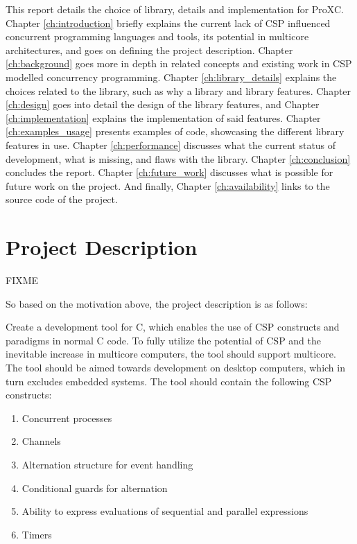 This report details the choice of library, details and implementation for ProXC. Chapter \ref{ch:introduction} briefly explains the current lack of CSP influenced concurrent programming languages and tools, its potential in multicore architectures, and goes on defining the project description. Chapter \ref{ch:background} goes more in depth in related concepts and existing work in CSP modelled concurrency programming. Chapter \ref{ch:library_details} explains the choices related to the library, such as why a library and library features. Chapter \ref{ch:design} goes into detail the design of the library features, and Chapter \ref{ch:implementation} explains the implementation of said features. Chapter \ref{ch:examples_usage} presents examples of code, showcasing the different library features in use. Chapter \ref{ch:performance} discusses what the current status of development, what is missing, and flaws with the library. Chapter \ref{ch:conclusion} concludes the report. Chapter \ref{ch:future_work} discusses what is possible for future work on the project. And finally, Chapter \ref{ch:availability} links to the source code of the project.


\section{Project Description}
\label{sec:project_description}

FIXME

So based on the motivation above, the project description is as follows:

Create a development tool for C, which enables the use of CSP constructs and paradigms in normal C code. To fully utilize the potential of CSP and the inevitable increase in multicore computers, the tool should support multicore. The tool should be aimed towards development on desktop computers, which in turn excludes embedded systems. The tool should contain the following CSP constructs:

\begin{enumerate}
    \item Concurrent processes
    \item Channels
    \item Alternation structure for event handling
    \item Conditional guards for alternation
    \item Ability to express evaluations of sequential and parallel expressions
    \item Timers
\end{enumerate}


